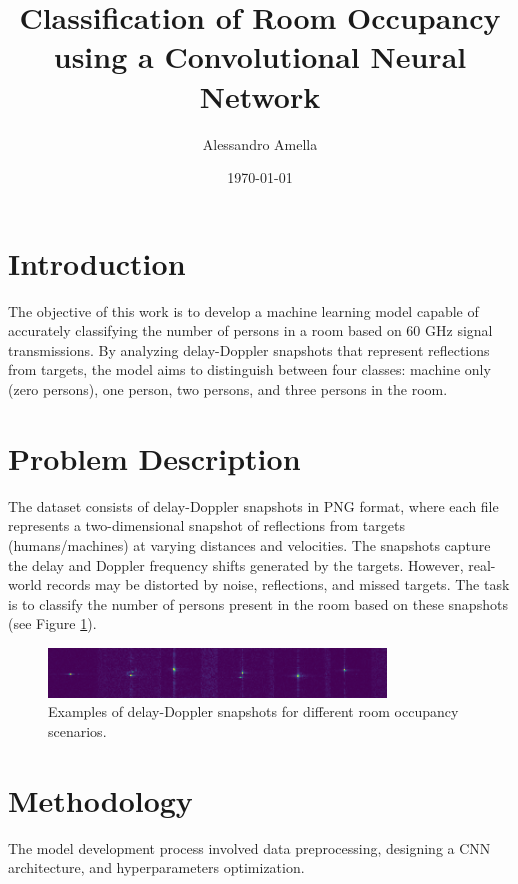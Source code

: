 \documentclass{article}
\title{Classification of Room Occupancy using a Convolutional Neural Network}
\author{Alessandro Amella}
\date{\today}
\begin{document}
\maketitle




\section{Introduction}
The objective of this work is to develop a machine learning model capable of accurately classifying the number of persons in a room based on 60 GHz signal transmissions. By analyzing delay-Doppler snapshots that represent reflections from targets, the model aims to distinguish between four classes: machine only (zero persons), one person, two persons, and three persons in the room.

\section{Problem Description}
The dataset consists of delay-Doppler snapshots in PNG format, where each file represents a two-dimensional snapshot of reflections from targets (humans/machines) at varying distances and velocities. The snapshots capture the delay and Doppler frequency shifts generated by the targets. However, real-world records may be distorted by noise, reflections, and missed targets. The task is to classify the number of persons present in the room based on these snapshots (see Figure \ref{fig:snapshots}).

\begin{figure}
    \centering
    \includegraphics[width=0.8\textwidth]{training_data_example.png}
    \caption{Examples of delay-Doppler snapshots for different room occupancy scenarios.}
    \label{fig:snapshots}
\end{figure}

\section{Methodology}
The model development process involved data preprocessing, designing a CNN architecture, and hyperparameters optimization.
\end{document}
